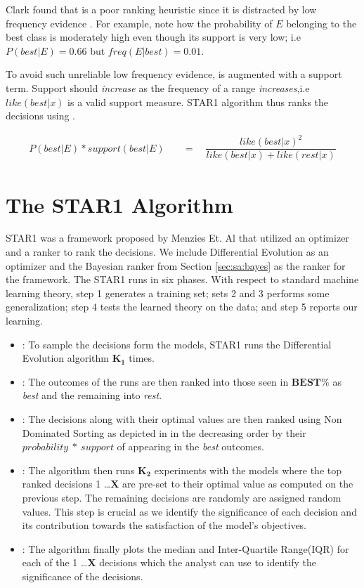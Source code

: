 Clark found that  is a poor ranking heuristic since it is distracted by low frequency evidence \cite{clark05}. For example, note how the probability of $E$ belonging to the best class is moderately high even though its support is very low; i.e $P(best|E) = 0.66$ but $freq(E|best) = 0.01$.

To avoid such unreliable low frequency evidence,  is augmented with a support term. Support should \textit{increase} as the frequency of a range \textit{increases},i.e $like(best|x)$ is a valid support measure. STAR1 algorithm thus ranks the decisions using .

\begin{equation}
    \begin{aligned}
        P(best|E) * support(best|E) &\quad = \quad \dfrac{like(best|x)^2}{like(best|x) + like(rest|x)}
    \end{aligned}
    \label{eq:star1}
\end{equation}


\section{The STAR1 Algorithm}
\label{sec:sa:star1}

STAR1 was a framework proposed by Menzies Et. Al \cite{menzies07} that utilized an optimizer and a ranker to rank the decisions. We include Differential Evolution as an optimizer and the Bayesian ranker from Section \ref{sec:sa:bayes} as the ranker for the framework. The STAR1 runs in six phases. With respect to standard machine learning theory, step 1 generates a training set; sets 2 and 3 performs some generalization; step 4 tests the learned theory on the data; and step 5 reports our learning.

\begin{itemize}
    \item {}: To sample the decisions form the models, STAR1 runs the Differential Evolution algorithm $\bm{K_1}$ times.
    \item {}: The outcomes of the runs are then ranked into those seen in $\bm{BEST}$\% as \textit{best} and the remaining into \textit{rest}.
    \item {}: The decisions along with their optimal values are then ranked using Non Dominated Sorting as depicted in  in the decreasing order by their $probability\ *\ support$  of appearing in the \textit{best} outcomes.
    \item {}: The algorithm then runs $\bm{K_2}$ experiments with the models where the top ranked decisions 1 \ldots $\bm{X}$ are pre-set to their optimal value as computed on the previous step. The remaining decisions are randomly are assigned random values. This step is crucial as we identify the significance of each decision and its contribution towards the satisfaction of the model's objectives.
    \item {}: The algorithm finally plots the median and Inter-Quartile Range(IQR) for each of the 1 \dots $\bm{X}$ decisions which the analyst can use to identify the significance of the decisions.
\end{itemize}

